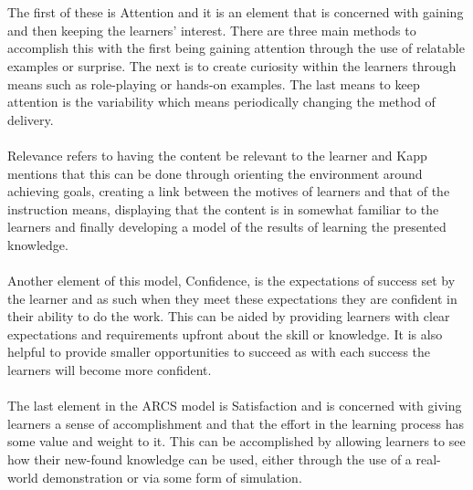 \documentclass[conference]{IEEEtran}
\begin{document}
\\\\
The first of these is Attention and it is an element that is concerned with gaining and then keeping the learners’ interest. There are three main methods to accomplish this with the first being gaining attention through the use of relatable examples or surprise. The next is to create curiosity within the learners through means such as role-playing or hands-on examples. The last means to keep attention is the variability which means periodically changing the method of delivery\cite{Kapp2012a, keller1987development}.
\\\\
Relevance refers to having the content be relevant to the learner\cite{keller1987development} and Kapp\cite{Kapp2012a} mentions that this can be done through orienting the environment around achieving goals, creating a link between the motives of learners and that of the instruction means, displaying that the content is in somewhat familiar to the learners and finally developing a model of the results of learning the presented knowledge\cite{keller1987development}.
\\\\
Another element of this model, Confidence, is the expectations of success set by the learner and as such when they meet these expectations they are confident in their ability to do the work\cite{Kapp2012a, keller1987development}. This can be aided by providing learners with clear expectations and requirements upfront about the skill or knowledge. It is also helpful to provide smaller opportunities to succeed as with each success the learners will become more confident\cite{Kapp2012a, keller1987development}.
\\\\
The last element in the ARCS model is Satisfaction and is concerned with giving learners a sense of accomplishment and that the effort in the learning process has some value and weight to it\cite{Kapp2012a, keller1987development}. This can be accomplished by allowing learners to see how their new-found knowledge can be used, either through the use of a real-world demonstration or via some form of simulation\cite{Kapp2012a, keller1987development}.
\end{document}
